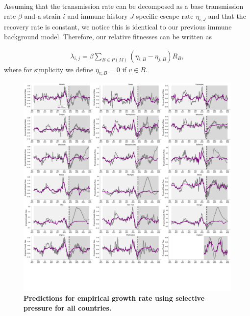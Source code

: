 \documentclass[12pt,oneside,letterpaper]{article}
\begin{document}
Assuming that the transmission rate can be decomposed as a base transmission rate $\beta$ and a strain $i$ and immune history $J$ specific escape rate $\eta_{i, J}$ and that the recovery rate is constant, we notice this is identical to our previous immune background model.
Therefore, our relative fitnesses can be written as

\begin{align*}
    \lambda_{i, j} = \beta \sum_{B \in P(M)} (\eta_{i, B} - \eta_{j, B}) R_{B},
\end{align*}
where for simplicity we define $\eta_{v, B} = 0$ if $v \in B$.

    \begin{figure}[t!]
        \centering
        \includegraphics[width=0.9\textwidth=0.01]{./supplementary_figures/empirical-growth-rate-predictions-all.png}
        \caption{
            \textbf{Predictions for empirical growth rate using selective pressure for all countries.}
        }
        \label{fig:empirical-growth-rate-predictions-all}
    \end{figure}
\end{document}
